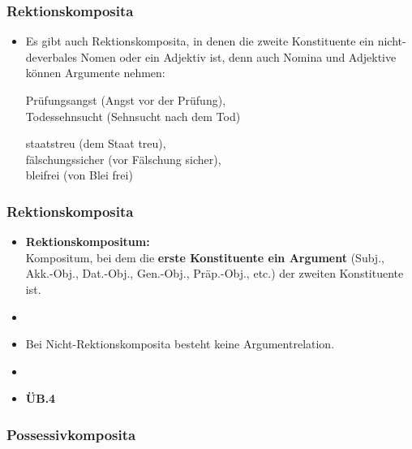 \begin{frame}
\frametitle{Rektionskomposita}

\begin{itemize}
	\item Es gibt auch Rektionskomposita, in denen die zweite Konstituente ein nicht-deverbales Nomen oder ein Adjektiv ist, denn auch Nomina und Adjektive können Argumente nehmen:
	
	\ea Prüfungsangst (Angst vor der Prüfung), \\
		 Todessehnsucht (Sehnsucht nach dem Tod)
	\z
		 
	\ea staatstreu (dem Staat treu), \\
		 fälschungssicher (vor Fälschung sicher), \\
		 bleifrei (von Blei frei)
	\z
		 
\end{itemize}


\end{frame}


\begin{frame}
\frametitle{Rektionskomposita}

\begin{itemize}
	\item \textbf{Rektionskompositum:} \\
	Kompositum, bei dem die \textbf{erste Konstituente ein Argument} (Subj., Akk.-Obj., Dat.-Obj., Gen.-Obj., Präp.-Obj., etc.) der zweiten Konstituente ist.
	\item[]
	\item Bei Nicht-Rektionskomposita besteht keine Argumentrelation.
	\item[]
	\item[] \textbf{ÜB.4}
	
\end{itemize}


\end{frame}


\subsubsection{Possessivkomposita}


